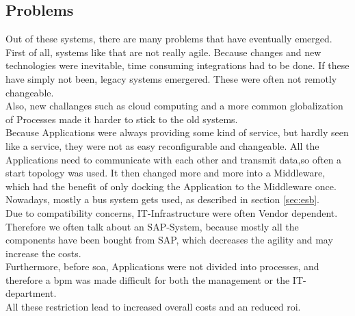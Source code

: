 \documentclass[12pt]{article}
\begin{document}
\subsection{Problems}
Out of these systems, there are many problems that have eventually emerged. \\
First of all, systems like that are not really agile. Because changes and new technologies were inevitable, time consuming integrations had to be done. If these have simply not been, legacy systems emergered. These were often not remotly changeable. \\
Also, new challanges such as cloud computing and a more common globalization of Processes made it harder to stick to the old systems. \\
Because Applications were always providing some kind of service, but hardly seen like a service, they were not as easy reconfigurable and changeable. All the Applications need to communicate with each other and transmit data,so often a start topology was used. It then changed more and more into a Middleware, which had the benefit of only docking the Application to the Middleware once. Nowadays, mostly a bus system gets used, as described in section \ref{sec:esb}. \\
Due to compatibility concerns, IT-Infrastructure were often Vendor dependent. Therefore we often talk about an SAP-System, because mostly all the components have been bought from SAP, which decreases the agility and may increase the costs.\\
Furthermore, before \gls{soa}, Applications were not divided into processes, and therefore a \gls{bpm} was made difficult for both the management or the IT-department. \\
All these restriction lead to increased overall costs and an reduced \gls{roi}.
\end{document}
